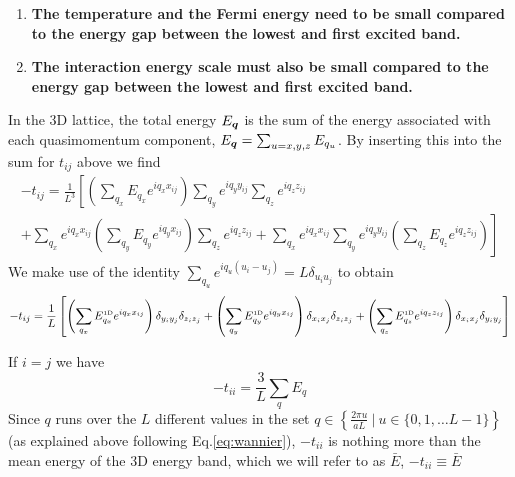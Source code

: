 \begin{enumerate}
\item \textbf{The temperature and the Fermi energy need to be small compared to
the energy gap between the lowest and first excited band.}

\item \textbf{The interaction energy scale must also be small compared to the
energy gap between the lowest and first excited band.}
\end{enumerate}

In the 3D lattice, the total energy $E_{\bm{q}}$ is the sum of the energy
associated with each quasimomentum component, $E_{\bm{q}} = \sum_{u=x,y,z}
E_{q_{u}} $.  By inserting this into the sum for $t_{ij}$ above we find 
\begin{multline}
-t_{ij} =  \frac{1}{L^{3}} \left[ 
          \left(\sum_{q_{x}} E_{q_{x}}   e^{ i q_{x} x_{ij} }   \right)
          \sum_{q_{y}} e^{ i q_{y} y_{ij} }   
          \sum_{q_{z}} e^{ i q_{z} z_{ij} }  
   \right. \\
\left. 
          + 
          \sum_{q_{x}} e^{ i q_{x} x_{ij} }  
          \left(\sum_{q_{y}} E_{q_{y}}   e^{ i q_{y} x_{ij} }   \right)
          \sum_{q_{z}} e^{ i q_{z} z_{ij} }  
          + 
          \sum_{q_{x}} e^{ i q_{x} x_{ij} }  
          \sum_{q_{y}} e^{ i q_{y} y_{ij} }   
          \left(\sum_{q_{z}} E_{q_{z}}   e^{ i q_{z} z_{ij} }   \right)
\right]
\end{multline}
We make use of the identity $\sum_{q_{u}} e^{ iq_{u}(u_{i}-u_{j}) } = L
\delta_{u_{i}u_{j}}$ to obtain
\begin{equation}
-t_{ij} =  \frac{1}{L} \left[ 
    \left(\sum_{q_{x}} E_{q_{x}}^{\text{\tiny 1D}}  e^{ i q_{x} x_{ij} } \right)
    \delta_{y_{i}y_{j}}
    \delta_{z_{i}z_{j}}
    + 
    \left(\sum_{q_{y}} E_{q_{y}}^{\text{\tiny 1D}}  e^{ i q_{y} x_{ij} } \right)
    \delta_{x_{i}x_{j}}
    \delta_{z_{i}z_{j}}
    + 
    \left(\sum_{q_{z}} E_{q_{z}}^{\text{\tiny 1D}}  e^{ i q_{z} z_{ij} } \right)
    \delta_{x_{i}x_{j}}
    \delta_{y_{i}y_{j}}
\right]
\label{eq:tunnelinglong}
\end{equation}

If $i=j$ we have 
\begin{equation}
  -t_{ii} =  \frac{3}{L} 
          \sum_{q} E_{q} 
\end{equation}
Since $q$ runs over the $L$ different values in the set $q \in \left\lbrace
\frac{2\pi u}{a L} \ |\  u \in \lbrace 0,1,\ldots L-1 \rbrace \right\rbrace$
(as explained above following Eq.\ref{eq:wannier}), $-t_{ii}$ is nothing more
than the mean energy of the 3D energy band, which we will refer to as
$\bar{E}$,  $-t_{ii}\equiv \bar{E}$  

